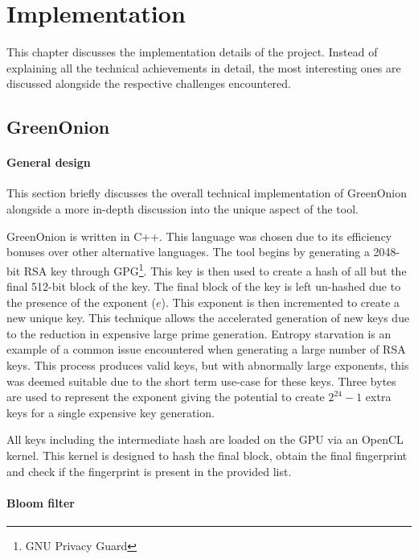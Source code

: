 \chapter{Implementation}
\label{cha:Implementation}

This chapter discusses the implementation details of the project. Instead of explaining all the technical achievements in detail, the most interesting ones are discussed alongside the respective challenges encountered.

\section{GreenOnion}

\subsubsection{General design}
This section briefly discusses the overall technical implementation of GreenOnion alongside a more in-depth discussion into the unique aspect of the tool.

GreenOnion is written in C++. This language was chosen due to its efficiency bonuses over other alternative languages.
The tool begins by generating a 2048-bit RSA key through GPG\footnote{GNU Privacy Guard}. This key is then used to create a hash of all but the final 512-bit block of the key. The final block of the key is left un-hashed due to the presence of the exponent ($e$). This exponent is then incremented to create a new unique key. This technique allows the accelerated generation of new keys due to the reduction in expensive large prime generation. Entropy starvation is an example of a common issue encountered when generating a large number of RSA keys. This process produces valid keys, but with abnormally large exponents, this was deemed suitable due to the short term use-case for these keys. Three bytes are used to represent the exponent giving the potential to create $2^{24} - 1$ extra keys for a single expensive key generation.

All keys including the intermediate hash are loaded on the GPU via an OpenCL kernel. This kernel is designed to hash the final block, obtain the final fingerprint and check if the fingerprint is present in the provided list.

\subsubsection{Bloom filter}

